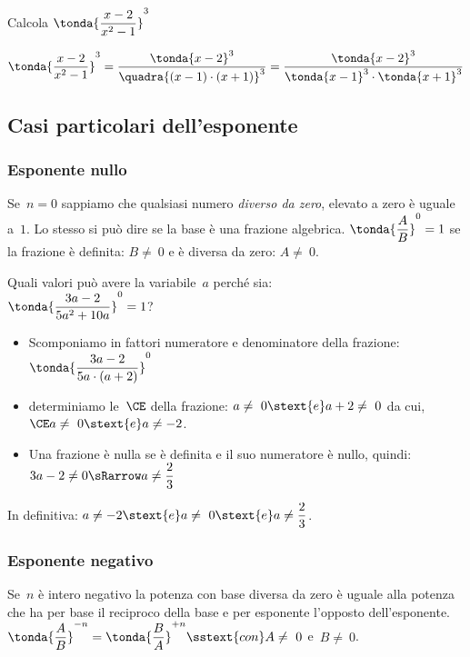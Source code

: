 \begin{esempio}{}{}
Calcola  \( \tonda{\dfrac{x-2}{x^{2}-1}} ^{3}\)

\vspace{-.5em}
\[\tonda{\dfrac{x-2}{x^{2}-1}} ^{3} =
\dfrac{\tonda{x-2}^3}{\quadra{(x-1)\cdot(x+1)}^3} = 
\dfrac{\tonda{x-2}^3}{\tonda{x-1}^3 \cdot \tonda{x+1}^3}\]
\end{esempio}

\subsection{Casi particolari dell'esponente}

\subsubsection{Esponente nullo}
Se~\(n = 0\) sappiamo che qualsiasi numero \emph{diverso da zero}, elevato a 
zero è uguale a~\(1\). 
Lo stesso si può dire se la base è una frazione algebrica.
\(\tonda{\dfrac{A}{B}}^0=1\) se la frazione è definita: 
\(B\neq~0\) e è diversa da zero: \(A\neq~0\).

\begin{esempio}{}{}
Quali valori può avere la variabile~\(a\) perché sia: \\
\(\tonda{\dfrac{3a-2}{5a^{2}+10a}} ^{0}=1\)?

\vspace{.5em}
\begin{itemize}[nosep]
\item Scomponiamo in fattori numeratore e denominatore della 
frazione:\\ \( \tonda{\dfrac{3a-2}{5a\cdot (a+2)}} ^{0}\)
\item determiniamo le~\(\CE\) della frazione:
\(a\neq~0 \stext{e} a+2\neq~0\) 
da cui, \(\CE a\neq~0 \stext{e} a\neq -2\).
\item Una frazione è nulla se è definita e il suo numeratore è nullo, 
quindi:
\(3a-2 \neq 0 \sRarrow a\neq \dfrac{2}{3}\)
\end{itemize}
In definitiva: \(a\neq -2 \stext{e} a\neq~0 \stext{e} a\neq \dfrac{2}{3}\).
\end{esempio}

\subsubsection{Esponente negativo}
Se~\(n\) è intero negativo la potenza con base diversa da zero è uguale alla 
potenza che ha per base il reciproco della base e per esponente l'opposto
dell'esponente. 
\( \tonda{\dfrac{A}{B}} ^{-n}=
\tonda{\dfrac{B}{A}} ^{+n} \sstext{con} A\neq~0\) e~\(B\neq~0\).

